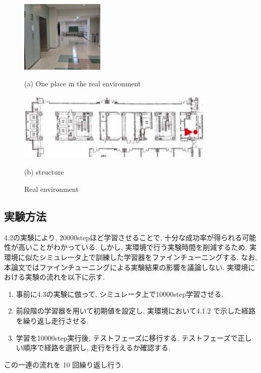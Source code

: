 \begin{itemize}
  \begin{figure}[h]
    \centering
    \begin{minipage}[b]{120mm}
      \centering
      \includegraphics[width=40mm]{images/real.png}
      \caption*{(a) One place in the real environment}
    \end{minipage} 
    \begin{minipage}[b]{120mm}
      \centering
      \includegraphics[width=95mm]{images/tsudanuma_structure.png}
      \caption*{(b) structure}
    \end{minipage}
    \caption{Real environment}
    \label{Fig:real_environment}
  \end{figure}
\end{itemize}

\subsection{実験方法}
4.2の実験により, 20000stepほど学習させることで, 十分な成功率が得られる可能性が高いことがわかっている. しかし, 実環境で行う実験時間を削減するため, 実環境に似たシミュレータ上で訓練した学習器をファインチューニングする. なお, 本論文ではファインチューニングによる実験結果の影響を議論しない. 実環境における実験の流れを以下に示す.
\begin{enumerate}
  \item 事前に4.3の実験に倣って, シミュレータ上で10000step学習させる. 
  \item 前段階の学習器を用いて初期値を設定し, 実環境において4.1.2 で示した経路を繰り返し走行させる.
  \item 学習を10000step実行後, テストフェーズに移行する. テストフェーズで正しい順序で経路を選択し, 走行を行えるか確認する.
\end{enumerate}
この一連の流れを 10 回繰り返し行う.

